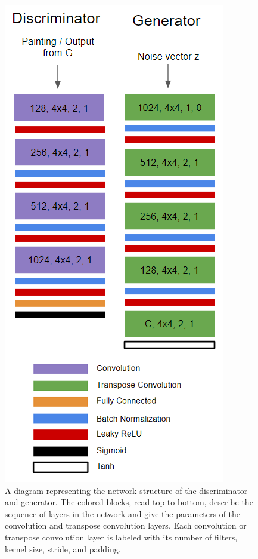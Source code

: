 \documentclass[10pt,twocolumn,letterpaper]{article}
\begin{document}
\begin{figure}[t]
	\begin{center}
		\includegraphics[width=0.8\linewidth]{nets1.png}
	\end{center}
	\caption{A diagram representing the network structure of the discriminator and generator. The colored blocks, read top to bottom, describe the sequence of layers in the network and give the parameters of the convolution and transpose convolution layers. Each convolution or transpose convolution layer is labeled with its number of filters, kernel size, stride, and padding.}
	\label{fig:long}
	\label{fig:onecol}
\end{figure}
\end{document}
